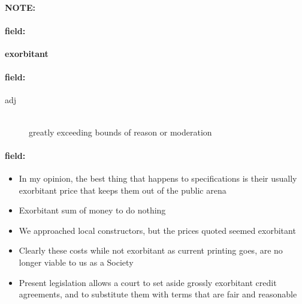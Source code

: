 \documentclass[12pt]{article}
\newenvironment{note}{\paragraph{NOTE:}}{}
\newenvironment{field}{\paragraph{field:}}{}
\begin{document}
\begin{note}
\begin{field}
\textbf{\large exorbitant}
\end{field}


\begin{field}
\begin{description}
\item[adj] \hfill \\ 
greatly exceeding bounds of reason or moderation

\end{description}
\end{field}

\begin{field}
\begin{itemize}
\item In my opinion, the best thing that happens to specifications is their usually exorbitant price that keeps them out of the public arena
\item Exorbitant sum of money to do nothing
\item We approached local constructors, but the prices quoted seemed exorbitant
\item Clearly these costs while not exorbitant as current printing goes, are no longer viable to us as a Society
\item Present legislation allows a court to set aside grossly exorbitant credit agreements, and to substitute them with terms that are fair and reasonable
\end{itemize}
\end{field}
\end{note}
\end{document}
